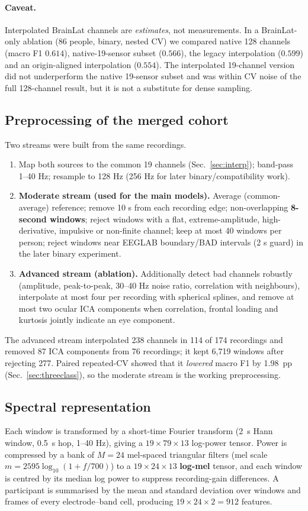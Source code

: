 \documentclass[10pt,twocolumn,a4paper]{article}
\begin{document}
\paragraph{Caveat.} Interpolated BrainLat channels are \emph{estimates}, not measurements. In a BrainLat-only ablation (86 people, binary, nested CV) we compared native 128 channels (macro F1 $0.614$), native-19-sensor subset ($0.566$), the legacy interpolation ($0.599$) and an origin-aligned interpolation ($0.554$). The interpolated 19-channel version did not underperform the native 19-sensor subset and was within CV noise of the full 128-channel result, but it is not a substitute for dense sampling.

\subsection{Preprocessing of the merged cohort}
\label{sec:prep}
Two streams were built from the same recordings.
\begin{enumerate}[label=(\arabic*)]
\item Map both sources to the common 19 channels (Sec.~\ref{sec:interp}); band-pass 1--40 Hz; resample to 128 Hz (256 Hz for later binary/compatibility work).
\item \textbf{Moderate stream (used for the main models).} Average (common-average) reference; remove 10 s from each recording edge; non-overlapping \textbf{8-second windows}; reject windows with a flat, extreme-amplitude, high-derivative, impulsive or non-finite channel; keep at most 40 windows per person; reject windows near EEGLAB boundary/BAD intervals (2 s guard) in the later binary experiment.
\item \textbf{Advanced stream (ablation).} Additionally detect bad channels robustly (amplitude, peak-to-peak, 30--40 Hz noise ratio, correlation with neighbours), interpolate at most four per recording with spherical splines, and remove at most two ocular ICA components when correlation, frontal loading and kurtosis jointly indicate an eye component.
\end{enumerate}
The advanced stream interpolated 238 channels in 114 of 174 recordings and removed 87 ICA components from 76 recordings; it kept 6,719 windows after rejecting 277. Paired repeated-CV showed that it \emph{lowered} macro F1 by 1.98~pp (Sec.~\ref{sec:threeclass}), so the moderate stream is the working preprocessing.

\subsection{Spectral representation}
\label{sec:spectral}
Each window is transformed by a short-time Fourier transform (2~s Hann window, 0.5~s hop, 1--40 Hz), giving a $19{\times}79{\times}13$ log-power tensor. Power is compressed by a bank of $M=24$ mel-spaced triangular filters (mel scale $m=2595\log_{10}(1+f/700)$) to a $19{\times}24{\times}13$ \textbf{log-mel} tensor, and each window is centred by its median log power to suppress recording-gain differences. A participant is summarised by the mean and standard deviation over windows and frames of every electrode--band cell, producing $19{\times}24{\times}2=912$ features.
\end{document}
